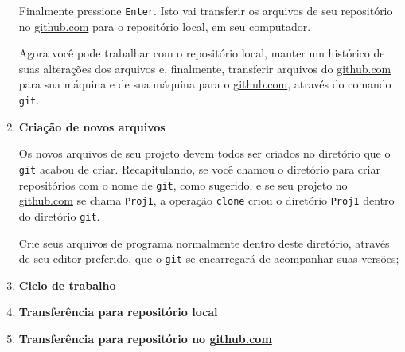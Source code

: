 \documentclass[10pt,a4paper]{article}
\begin{document}
\begin{enumerate}
		Finalmente pressione {\tt Enter}. Isto vai transferir os arquivos de seu repositório no \url{github.com} para o repositório local, em seu computador.
		
		Agora você pode trabalhar com o repositório local, manter um histórico de suas alterações dos arquivos e, finalmente, transferir arquivos do \url{github.com} para sua máquina e de sua máquina para o \url{github.com}, através do comando {\tt git}.
                
	\item {\bf Criação de novos arquivos}

    	Os novos arquivos de seu projeto devem todos ser criados no diretório que o {\tt git} acabou de criar. Recapitulando, se você chamou o diretório para criar repositórios com o nome de {\tt git}, como sugerido, e se seu projeto no \url{github.com} se chama {\tt Proj1}, a operação {\tt clone} criou o diretório {\tt Proj1} dentro do diretório {\tt git}.
    	
    	Crie seus arquivos de programa normalmente dentro deste diretório, através de seu editor preferido, que o {\tt git} se encarregará de acompanhar suas versões;
                
    \item {\bf Ciclo de trabalho}
        
	\item {\bf Transferência para repositório local}
                
    \item {\bf Transferência para repositório no \url{github.com}}
        
\end{enumerate}
\end{document}
